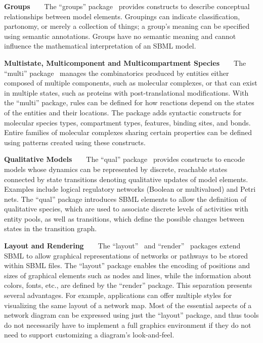 \documentclass{sbml-paper}
\begin{document}
\textbf{Groups}~~~~The ``groups'' package~\citep{hucka2016sbml} provides constructs to describe conceptual relationships between model elements. Groupings can indicate classification, partonomy, or merely a collection of things; a group's meaning can be specified using semantic annotations.  Groups have no semantic meaning and cannot influence the mathematical interpretation of an SBML model.

\textbf{Multistate, Multicomponent and Multicompartment Species}~~~~The ``multi'' package~\citep{zhang2018multi} manages the combinatorics produced by entities either composed of multiple components, such as molecular complexes, or that can exist in multiple states, such as proteins with post-translational modifications. With the ``multi'' package, rules can be defined for how reactions depend on the states of the entities and their locations. The package adds syntactic constructs for molecular species types, compartment types, features, binding sites, and bonds.  Entire families of molecular complexes sharing certain properties can be defined using patterns created using these constructs.

\textbf{Qualitative Models}~~~~The ``qual'' package~\citep{Chaouiya2015sbml} provides constructs to encode models whose dynamics can be represented by discrete, reachable states connected by state transitions denoting qualitative updates of model elements. Examples include logical regulatory networks (Boolean or multivalued) and Petri nets. The ``qual'' package introduces SBML elements to allow the definition of qualitative species, which are used to associate discrete levels of activities with entity pools, as well as transitions, which define the possible changes between states in the transition graph.

\textbf{Layout and Rendering}~~~~The ``layout''~\citep{Gauges2015} and ``render''~\citep{Bergmann2018sbml} packages extend SBML to allow graphical representations of networks or pathways to be stored within SBML files. The ``layout'' package enables the encoding of positions and sizes of graphical elements such as nodes and lines, while the information about colors, fonts, etc., are defined by the ``render'' package. This separation presents several advantages. For example, applications can offer multiple styles for visualizing the same layout of a network map. Most of the essential aspects of a network diagram can be expressed using just the ``layout'' package, and thus tools do not necessarily have to implement a full graphics environment if they do not need to support customizing a diagram's look-and-feel.
\end{document}
